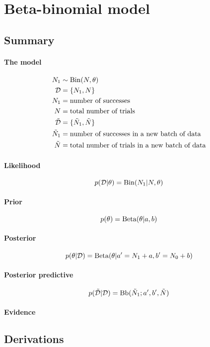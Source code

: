 \section{Beta-binomial model}
\subsection{Summary}
\paragraph{The model}
    \begin{align}
        N_1                 &\sim \operatorname{Bin}(N, \theta) \\
        \mathcal D          &= \{N_1, N\} \\
        N_1                 &= \text{number of successes} \\
        N                   &= \text{total number of trials} \\
        \tilde{\mathcal D}  &= \{\tilde N_1, \tilde N\} \\
        \tilde N_1          &= \text{number of successes in a new batch of data} \\
        \tilde N            &= \text{total number of trials in a new batch of data}
    \end{align}

\paragraph{Likelihood}
    \begin{equation}
        p(\mathcal D | \theta) = \operatorname{Bin}(N_1 | N, \theta)
    \end{equation}

\paragraph{Prior}
    \begin{equation}
        p(\theta)   = \operatorname{Beta}(\theta | a, b)
    \end{equation}

\paragraph{Posterior}
    \begin{equation}
        p(\theta | \mathcal D) = \operatorname{Beta}(\theta | a' = N_1 + a, b' = N_0 + b)
    \end{equation}

\paragraph{Posterior predictive}
    \begin{equation}
        p(\tilde{\mathcal D} | \mathcal D) = \operatorname{Bb}(\tilde N_1; a', b', \tilde N)
    \end{equation}

\paragraph{Evidence}

\subsection{Derivations}